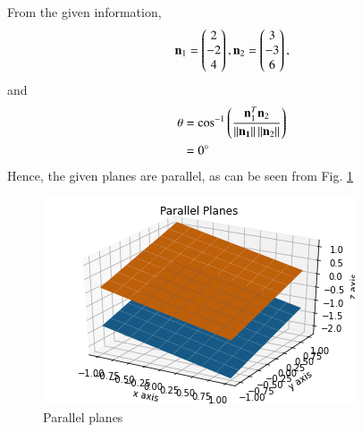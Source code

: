 From the given information, 
\begin{equation}
 \mathbf n_1=\begin{pmatrix}2\\-2\\4\end{pmatrix},
 \mathbf n_2 =\begin{pmatrix}3\\-3\\6\end{pmatrix},
\end{equation}
and 
\begin{align}
    \theta &= \cos^{-1}\left({\frac{\mathbf{n}_1^{T}\mathbf{n}_2}{\left\lVert\mathbf{n_1}\right\rVert\left\lVert\mathbf{n}_2\right\rVert}}\right)
    \\
 &= 0\degree
\end{align}
Hence, the given planes are parallel, as can be seen from Fig. \ref{linform/43/c/fig: PARALLEL planes.}
%
\begin{figure}[ht]
    \centering
   \includegraphics[width=\columnwidth]{solutions/su2021/2/43/c/ASSIGNMENT 5.png}
    \caption{Parallel planes}
    \label{linform/43/c/fig: PARALLEL planes.}
\end{figure}    

